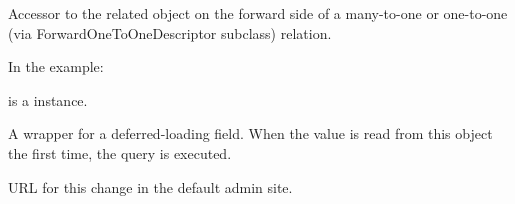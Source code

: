 \documentclass[letterpaper,10pt,english]{sphinxmanual}
\begin{document}
\begin{fulllineitems}
\begin{fulllineitems}
\label{\detokenize{modules/models:gestion.models.HistoricalPinte.previous_owner}}
Accessor to the related object on the forward side of a many-to-one or
one-to-one (via ForwardOneToOneDescriptor subclass) relation.

In the example:

\begin{sphinxVerbatim}[commandchars=\\\{\}]
 
       
\end{sphinxVerbatim}

 is a  instance.

\end{fulllineitems}


\begin{fulllineitems}
\label{\detokenize{modules/models:gestion.models.HistoricalPinte.previous_owner_id}}
A wrapper for a deferred-loading field. When the value is read from this
object the first time, the query is executed.

\end{fulllineitems}


\begin{fulllineitems}
\label{\detokenize{modules/models:gestion.models.HistoricalPinte.revert_url}}
URL for this change in the default admin site.

\end{fulllineitems}


\end{fulllineitems}

\end{document}
